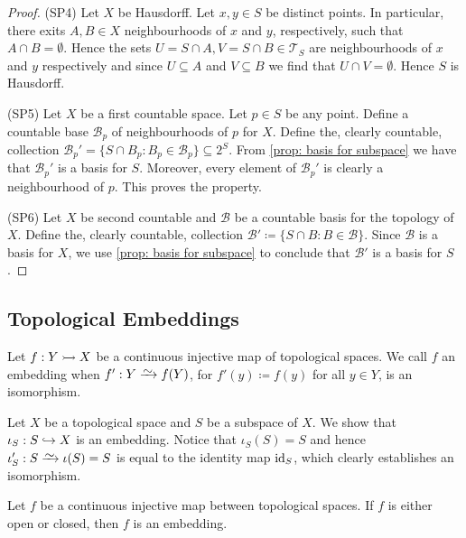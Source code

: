 \begin{proof}
(SP4) Let \(X\) be Hausdorff. Let \(x, y \in S\) be distinct points. In
particular, there exits \(A, B \in X\) neighbourhoods of \(x\) and \(y\),
respectively, such that \(A \cap B = \emptyset\). Hence the sets \(U = S \cap
A, V = S \cap B \in \mathcal T_S\) are neighbourhoods of \(x\) and \(y\)
respectively and since \(U \subseteq A\) and \(V \subseteq B\) we find that
\(U \cap V = \emptyset\). Hence \(S\) is Hausdorff.

(SP5) Let \(X\) be a first countable space. Let \(p \in S\) be any point.
Define a countable base \(\mathcal B_p\) of neighbourhoods of \(p\) for \(X\).
Define the, clearly countable, collection
\(\mathcal B_p' = \{S \cap B_p \colon B_p \in \mathcal B_p\} \subseteq
2^S\). From \cref{prop: basis for subspace} we have that \(\mathcal B_p'\) is a
basis for \(S\). Moreover, every element of \(\mathcal B_p'\) is clearly a
neighbourhood of \(p\). This proves the property.

(SP6) Let \(X\) be second countable and \(\mathcal B\) be a countable basis for
the topology of \(X\). Define the, clearly countable, collection
\(\mathcal B' \coloneq \{S \cap B \colon B \in \mathcal B\}\). Since
\(\mathcal B\) is a basis for \(X\), we use \cref{prop: basis for subspace} to
conclude that \(\mathcal B'\) is a basis for \(S\).
\end{proof}

\subsection{Topological Embeddings}

\begin{definition}[Embedding]\label{def: topological embedding}
Let \(f: Y \rightarrowtail X\) be a continuous injective map of topological spaces. We
call \(f\) an embedding when \(f': Y \isoto f(Y)\), for \(f'(y) \coloneq f(y)\)
for all \(y \in Y\), is an isomorphism.
\end{definition}

\begin{example}
Let \(X\) be a topological space and \(S\) be a subspace of \(X\). We show
that \(\iota_S: S \hookrightarrow X\) is an embedding. Notice that
\(\iota_S(S) = S\) and hence \(\iota_S': S \isoto \iota(S) = S\) is equal to
the identity map \(\operatorname{id}_S\), which clearly establishes an isomorphism.
\end{example}

\begin{proposition}
Let \(f\) be a continuous injective map between topological spaces. If \(f\)
is either open or closed, then \(f\) is an embedding.
\end{proposition}

